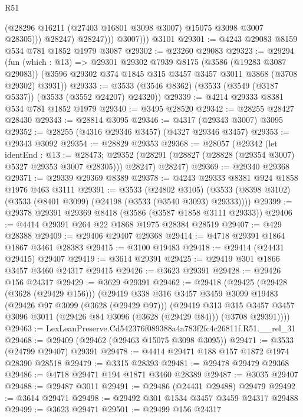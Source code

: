 \begin{lexlean}{R51}
\begin{coremodule}
                    (@28296 @16211 (@27403 @16801 @3098 @3007) @15075 @3098 @3007 @28305)))
                @28247)
              @28247)))
          @3007)))
    @3101
@29301 := @4243 @29083 @8159 @534 @781 @1852 @1979 @3087
@29302 := @23260 @29083
@29323 := @29294
    (fun (which : @13) =>
    @29301
      @29302
      @7939
      @8175
      (@3586 (@19283 @3087 @29083))
      (@3596 @29302 @374 @1845 @315 @3457 @3457 @3011 @3868 (@3708 @29302) @3931))
@29333 := @3533 (@3546 @8362) (@3533 (@3549 (@3187 @5337)) (@3533 (@3552 @24207) @24320))
@29339 := @4214 @29333 @8381 @534 @781 @1852 @1979
@29340 := @3495 @28520
@29342 := @28255 @28427 @28430
@29343 := @28814 @3095
@29346 := @4317 (@29343 @3007) @3095
@29352 := @28255 (@4316 @29346 @3457) (@4327 @29346 @3457)
@29353 := @29343 @3092
@29354 := @28829 @29353
@29368 := @28057
    (@29342
      (let identEnd : @13 := @28473;
      @29352 (@28291 (@28827 (@28828 (@29354 @3007) @5327 @29353 @3007 @28305))) @28247)
      @28247)
@29369 := @29340 @29368
@29371 := @29339 @29369 @8389
@29378 := @4243 @29333 @8381 @924 @1858 @1976 @463 @3111
@29391 := @3533
    (@24802 @3105)
    (@3533 (@8398 @3102) (@3533 (@8401 @3099) (@24198 (@3533 (@3540 @3093) @29333))))
@29399 := @29378 @29391 @29369 @8418 (@3586 (@3587 @1858 @3111 @29333))
@29406 := @4414 @29391 @264 @22 @1868 @1975 @28384 @28519
@29407 := @429 @28388
@29409 := @29406 @29407 @29368
@29414 := @4718 @29391 @1864 @1867 @3461 @28383
@29415 := @3100 @19483
@29418 := @29414 (@24431 @29415) @29407
@29419 := @3614 @29391
@29425 := @29419 @301 @1866 @3457 @3460 @24317 @29415
@29426 := @3623 @29391
@29428 := @29426 @156 @24317
@29429 := @3629 @29391
@29462 := @29418
    (@29425
      (@29428 (@3628 (@29429 @156)))
      (@29419
        @338
        @316
        @3457
        @3459
        @3099
        @19483
        (@29426 @97 @3099 (@3628 (@29429 @97)))
        (@29419
          @313
          @315
          @3457
          @3457
          @3096
          @3011
          (@29426 @84 @3096 (@3628 (@29429 @84)))
          (@3708 @29391))))
@29463 := LexLeanPreserve.Cd542376f089388a4a783f2fc4c26811f.R51.__rel_31
@29468 := @29409 (@29462 (@29463 @15075 @3098 @3095))
@29471 := @3533 (@24799 @29407) @29391
@29478 := @4414 @29471 @188 @157 @1872 @1974 @28390 @28518
@29479 := @3315 @28393
@29481 := @29478 @29479 @29368
@29486 := @4718 @29471 @194 @1871 @3460 @28389
@29487 := @3035 @29407
@29488 := @29487 @3011
@29491 := @29486 (@24431 @29488) @29479
@29492 := @3614 @29471
@29498 := @29492 @301 @1534 @3457 @3459 @24317 @29488
@29499 := @3623 @29471
@29501 := @29499 @156 @24317

\end{coremodule}
\end{lexlean}
